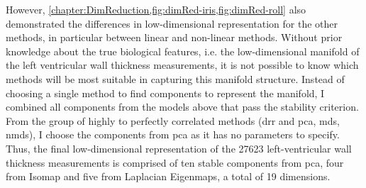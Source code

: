 %
However, \cref{chapter:DimReduction,fig:dimRed-iris,fig:dimRed-roll} also demonstrated the differences in low-dimensional representation for the other methods, in particular between linear and non-linear methods. Without prior knowledge about the true biological features, i.e. the  low-dimensional manifold of the left ventricular wall thickness measurements, it is not possible to know which methods will be most suitable in capturing this manifold structure. 
Instead of choosing a single method to find components to represent the manifold, I combined all components from the models above that pass the stability criterion. From the group of highly to perfectly correlated methods (\gls{drr} and \gls{pca}, \gls{mds}, \gls{nmds}), I choose the components from \gls{pca} as it has no parameters to specify. Thus, the final low-dimensional representation of the \num{27623} left-ventricular wall thickness measurements is comprised of ten stable components from \gls{pca}, four from Isomap and five from Laplacian Eigenmaps, a total of \num{19} dimensions.



 


